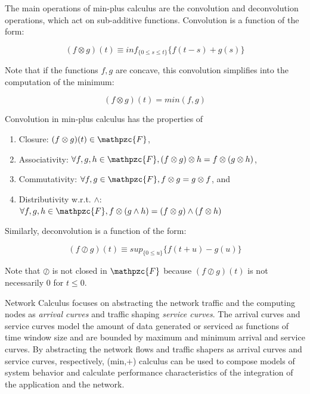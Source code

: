 The main operations of min-plus calculus are the convolution and
deconvolution operations, which act on sub-additive functions.
Convolution is a function of the form:

\begin{equation}
  (f\otimes g)(t)\equiv inf_{\{0\leq s \leq t\}}\{f(t-s)+g(s)\}
\end{equation}

Note that if the functions $f,g$ are concave, this convolution
simplifies into the computation of the minimum:

\begin{equation}
  (f\otimes g)(t)=min(f,g)
\end{equation}

Convolution in min-plus calculus has the properties of 

\begin{enumerate}
\item Closure: $(f\otimes g)(t) \in \mathpzc{F}$,
\item Associativity: $\forall f,g,h \in \mathpzc{F}, (f\otimes
  g)\otimes h = f\otimes(g\otimes h)$,
\item Commutativity: $\forall f,g \in \mathpzc{F}, f\otimes g
  = g\otimes f$, and
\item Distributivity w.r.t. $\wedge$: $\forall f,g,h \in \mathpzc{F},
  f\otimes(g\wedge h) = (f\otimes g)\wedge(f\otimes h)$
\end{enumerate}

Similarly, deconvolution is a function of the form:

\begin{equation} 
  (f\oslash g)(t)\equiv sup_{\{0\leq u\}}\{f(t+u)-g(u)\}
\end{equation}

Note that $\oslash$ is not closed in $\mathpzc{F}$ because $(f\oslash
g)(t)$ is not necessarily $0$ for $t\leq0$.

Network Calculus focuses on abstracting the network traffic and the
computing nodes as \textit{arrival curves} and traffic shaping
\textit{service curves}. The arrival curves and service curves model
the amount of data generated or serviced as functions of time window
size and are bounded by maximum and minimum arrival and service
curves.  By abstracting the network flows and traffic shapers as
arrival curves and service curves, respectively, (min,+) calculus can
be used to compose models of system behavior and calculate performance
characteristics of the integration of the application and the network.

